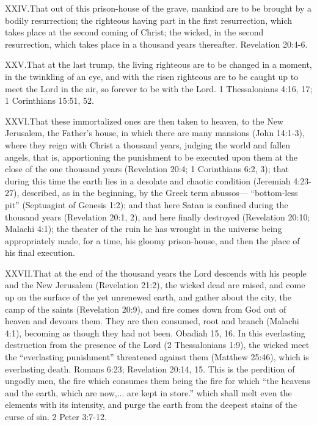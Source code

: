 \lettrine{XXIV.} That out of this prison-house of the grave, mankind are to be brought by a bodily resurrection; the righteous having part in the first resurrection, which takes place at the second coming of Christ; the wicked, in the second resurrection, which takes place in a thousand years thereafter. Revelation 20:4-6.

\lettrine{XXV.} That at the last trump, the living righteous are to be changed in a moment, in the twinkling of an eye, and with the risen righteous are to be caught up to meet the Lord in the air, so forever to be with the Lord. 1 Thessalonians 4:16, 17; 1 Corinthians 15:51, 52.

\lettrine{XXVI.} That these immortalized ones are then taken to heaven, to the New Jerusalem, the Father’s house, in which there are many mansions (John 14:1-3), where they reign with Christ a thousand years, judging the world and fallen angels, that is, apportioning the punishment to be executed upon them at the close of the one thousand years (Revelation 20:4; 1 Corinthians 6:2, 3); that during this time the earth lies in a desolate and chaotic condition (Jeremiah 4:23-27), described, as in the beginning, by the Greek term abussos— “bottom-less pit” (Septuagint of Genesis 1:2); and that here Satan is confined during the thousand years (Revelation 20:1, 2), and here finally destroyed (Revelation 20:10; Malachi 4:1); the theater of the ruin he has wrought in the universe being appropriately made, for a time, his gloomy prison-house, and then the place of his final execution.

\lettrine{XXVII.} That at the end of the thousand years the Lord descends with his people and the New Jerusalem (Revelation 21:2), the wicked dead are raised, and come up on the surface of the yet unrenewed earth, and gather about the city, the camp of the saints (Revelation 20:9), and fire comes down from God out of heaven and devours them. They are then consumed, root and branch (Malachi 4:1), becoming as though they had not been. Obadiah 15, 16. In this everlasting destruction from the presence of the Lord (2 Thessalonians 1:9), the wicked meet the “everlasting punishment” threatened against them (Matthew 25:46), which is everlasting death. Romans 6:23; Revelation 20:14, 15. This is the perdition of ungodly men, the fire which consumes them being the fire for which “the heavens and the earth, which are now,... are kept in store.” which shall melt even the elements with its intensity, and purge the earth from the deepest stains of the curse of sin. 2 Peter 3:7-12.

